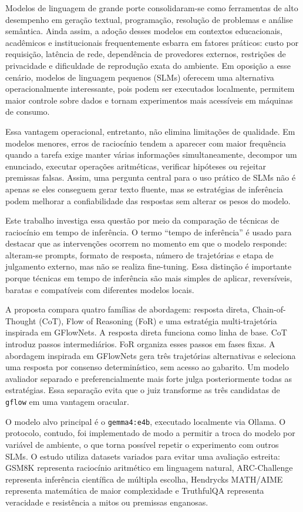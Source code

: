 \documentclass[12pt]{article}
\begin{document}
Modelos de linguagem de grande porte consolidaram-se como ferramentas de alto desempenho em geração textual, programação, resolução de problemas e análise semântica. Ainda assim, a adoção desses modelos em contextos educacionais, acadêmicos e institucionais frequentemente esbarra em fatores práticos: custo por requisição, latência de rede, dependência de provedores externos, restrições de privacidade e dificuldade de reprodução exata do ambiente. Em oposição a esse cenário, modelos de linguagem pequenos (SLMs) oferecem uma alternativa operacionalmente interessante, pois podem ser executados localmente, permitem maior controle sobre dados e tornam experimentos mais acessíveis em máquinas de consumo.

Essa vantagem operacional, entretanto, não elimina limitações de qualidade. Em modelos menores, erros de raciocínio tendem a aparecer com maior frequência quando a tarefa exige manter várias informações simultaneamente, decompor um enunciado, executar operações aritméticas, verificar hipóteses ou rejeitar premissas falsas. Assim, uma pergunta central para o uso prático de SLMs não é apenas se eles conseguem gerar texto fluente, mas se estratégias de inferência podem melhorar a confiabilidade das respostas sem alterar os pesos do modelo.

Este trabalho investiga essa questão por meio da comparação de técnicas de raciocínio em tempo de inferência. O termo ``tempo de inferência'' é usado para destacar que as intervenções ocorrem no momento em que o modelo responde: alteram-se prompts, formato de resposta, número de trajetórias e etapa de julgamento externo, mas não se realiza fine-tuning. Essa distinção é importante porque técnicas em tempo de inferência são mais simples de aplicar, reversíveis, baratas e compatíveis com diferentes modelos locais.

A proposta compara quatro famílias de abordagem: resposta direta, Chain-of-Thought (CoT), Flow of Reasoning (FoR) e uma estratégia multi-trajetória inspirada em GFlowNets. A resposta direta funciona como linha de base. CoT introduz passos intermediários. FoR organiza esses passos em fases fixas. A abordagem inspirada em GFlowNets gera três trajetórias alternativas e seleciona uma resposta por consenso determinístico, sem acesso ao gabarito. Um modelo avaliador separado e preferencialmente mais forte julga posteriormente todas as estratégias. Essa separação evita que o juiz transforme as três candidatas de \texttt{gflow} em uma vantagem oracular.

O modelo alvo principal é o \texttt{gemma4:e4b}, executado localmente via Ollama. O protocolo, contudo, foi implementado de modo a permitir a troca do modelo por variável de ambiente, o que torna possível repetir o experimento com outros SLMs. O estudo utiliza datasets variados para evitar uma avaliação estreita: GSM8K representa raciocínio aritmético em linguagem natural, ARC-Challenge representa inferência científica de múltipla escolha, Hendrycks MATH/AIME representa matemática de maior complexidade e TruthfulQA representa veracidade e resistência a mitos ou premissas enganosas.
\end{document}
